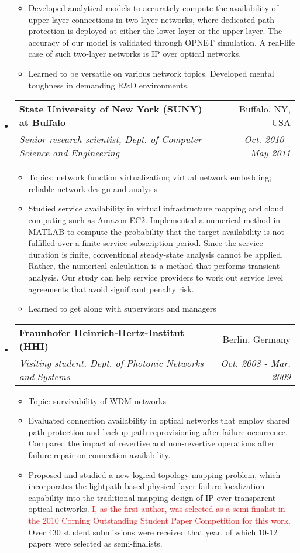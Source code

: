 \documentclass[letterpaper,11pt]{article}
\makeatletter
\newcommand{\ressubheading}[4]{
\begin{tabular*}{6.69in}{l@{\extracolsep{\fill}}r}
        \textbf{#1} & #2 \\
        \textit{#3} & \textit{#4} \\
\end{tabular*}\vspace{-6pt}
}
\newcommand{\resitem}[1]{\item #1 \vspace{-2pt}}
\makeatother
\begin{document}
\begin{itemize}
\begin{itemize}
        \resitem{Developed analytical models to accurately compute the availability of upper-layer connections in two-layer networks, where dedicated path protection is deployed at either the lower layer or the upper layer. The accuracy of our model is validated through OPNET simulation. A real-life case of such two-layer networks is IP over optical networks.}
        \resitem{Learned to be versatile on various network topics. Developed mental toughness in demanding R\&D environments.}
    \end{itemize}

\item
    \ressubheading{State University of New York (SUNY) at Buffalo}{Buffalo, NY, USA} %
    {Senior research scientist, Dept. of Computer Science and Engineering}{Oct. 2010 - May 2011} %
    \begin{itemize}
        \resitem{Topics: network function virtualization; virtual network embedding; reliable network design and analysis}
        \resitem{Studied service availability in virtual infrastructure mapping and cloud computing such as Amazon EC2. Implemented a numerical method in MATLAB to compute the probability that the target availability is not fulfilled over a finite service subscription period. Since the service duration is finite, conventional steady-state analysis cannot be applied. Rather, the numerical calculation is a method that performs transient analysis. Our study can help service providers to work out service level agreements that avoid significant penalty risk.}
        \resitem{Learned to get along with supervisors and managers}
    \end{itemize}

\item
    \ressubheading{Fraunhofer Heinrich-Hertz-Institut (HHI)}{Berlin, Germany}%
    {Visiting student, Dept. of Photonic Networks and Systems}{Oct. 2008 - Mar. 2009} %
    \begin{itemize}
        \resitem{Topic: survivability of WDM networks}
        \resitem{Evaluated connection availability in optical networks that employ shared path protection and backup path reprovisioning after failure occurrence. Compared the impact of revertive and non-revertive operations after failure repair on connection availability.}
        \resitem{Proposed and studied a new logical topology mapping problem, which incorporates the lightpath-based physical-layer failure localization capability into the traditional mapping design of IP over transparent optical networks. \textcolor{Red}{I, as the first author, was selected as a semi-finalist in the 2010 Corning Outstanding Student Paper Competition for this work.} Over 430 student submissions were received that year, of which 10-12 papers were selected as semi-finalists.}
    \end{itemize}


\end{itemize}
\end{document}
